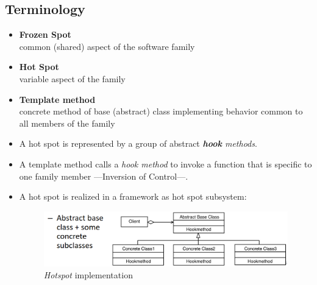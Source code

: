 \subsection{Terminology}
\begin{itemize}
   \item \textbf{Frozen Spot}\\
   common (shared) aspect of the software family
   \item \textbf{Hot Spot}\\
   variable aspect of the family
   \item \textbf{Template method}\\
   concrete method of base (abstract) class implementing behavior common to all members of the family
   \item A hot spot is represented by a group of abstract \textit{\textbf{hook} methods}.
   \item A template method calls a \textit{hook method} to invoke a function that is specific to one family member {---}Inversion of Control{---}.
   \item A hot spot is realized in a framework as hot spot subsystem:
   \begin{figure}[htbp]
      \centering
      \includegraphics{images/hotspot.png}
      \caption{\textit{Hotspot} implementation}
      \label{fig:hotspot}
   \end{figure}
\end{itemize}
